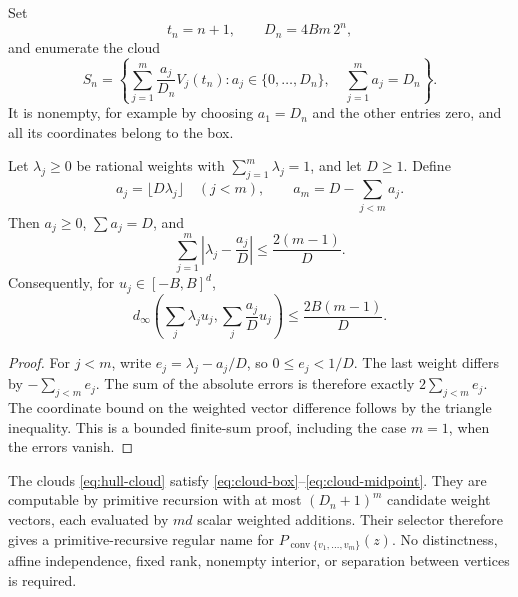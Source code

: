 Set
\[
 t_n=n+1,\qquad D_n=4Bm\,2^n,
\]
and enumerate the cloud
\begin{equation}
 \label{eq:hull-cloud}
 S_n=\left\{\sum_{j=1}^m\frac{a_j}{D_n}V_j(t_n):
       a_j\in\{0,\ldots,D_n\},\quad\sum_{j=1}^ma_j=D_n\right\}.
\end{equation}
It is nonempty, for example by choosing \(a_1=D_n\) and the other
entries zero, and all its coordinates belong to the box.

\begin{lemma}
\label{lem:simplex-rounding}
Let \(\lambda_j\geq0\) be rational weights with
\(\sum_{j=1}^m\lambda_j=1\), and let \(D\geq1\).
Define
\[
 a_j=\lfloor D\lambda_j\rfloor\quad(j<m),
 \qquad a_m=D-\sum_{j<m}a_j.
\]
Then \(a_j\geq0\), \(\sum a_j=D\), and
\[
 \sum_{j=1}^m\left|\lambda_j-\frac{a_j}{D}\right|
 \leq\frac{2(m-1)}D.
\]
Consequently, for \(u_j\in[-B,B]^d\),
\[
 d_\infty\left(\sum_j\lambda_j u_j,
              \sum_j\frac{a_j}{D}u_j\right)
 \leq\frac{2B(m-1)}D.
\]
\end{lemma}

\begin{proof}
For \(j<m\), write
\(e_j=\lambda_j-a_j/D\), so \(0\leq e_j<1/D\).
The last weight differs by \(-\sum_{j<m}e_j\).
The sum of the absolute errors is therefore exactly
\(2\sum_{j<m}e_j\).  The coordinate bound on the weighted vector
difference follows by the triangle inequality.  This is a bounded finite-sum
proof, including the case \(m=1\), when the errors vanish.
\end{proof}

\begin{proposition}
\label{prop:hull-cloud}
The clouds \eqref{eq:hull-cloud} satisfy
\eqref{eq:cloud-box}--\eqref{eq:cloud-midpoint}.  They are computable by
primitive recursion with at most \((D_n+1)^m\) candidate weight vectors,
each evaluated by \(md\) scalar weighted additions.  Their selector
therefore gives a primitive-recursive regular name for
\(P_{\operatorname{conv}\{v_1,\ldots,v_m\}}(z)\).
No distinctness, affine independence, fixed rank, nonempty interior, or
separation between vertices is required.
\end{proposition}

